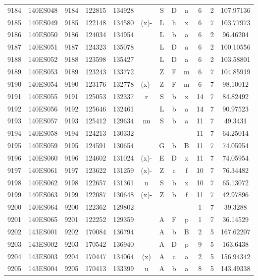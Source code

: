 \begin{tabular}{|*{12}{c|}}
9184 & 140ES048 & 9184 & 122815 & 134928 &  & S & D & a & 6 & 2 & 107.97136 \\ 
9185 & 140ES049 & 9185 & 122148 & 134580 & (x)- & L & h & x & 6 & 7 & 103.77973 \\ 
9186 & 140ES050 & 9186 & 124034 & 134954 &  & L & b & a & 6 & 2 & 96.46204 \\ 
9187 & 140ES051 & 9187 & 124323 & 135078 &  & L & D & a & 6 & 2 & 100.10556 \\ 
9188 & 140ES052 & 9188 & 123598 & 135427 &  & L & D & a & 6 & 2 & 103.58801 \\ 
9189 & 140ES053 & 9189 & 123243 & 133772 &  & Z & F & m & 6 & 7 & 104.85919 \\ 
9190 & 140ES054 & 9190 & 123176 & 132778 & (x)- & Z & F & m & 6 & 7 & 98.10012 \\ 
9191 & 140ES055 & 9191 & 125053 & 132337 & r & S & b & x & 14 & 7 & 84.82492 \\ 
9192 & 140ES056 & 9192 & 125646 & 132461 &  & L & b & a & 14 & 7 & 90.97523 \\ 
9193 & 140ES057 & 9193 & 125412 & 129634 & nu & S & b & a & 11 & 7 & 49.3431 \\ 
9194 & 140ES058 & 9194 & 124213 & 130332 &  &  &  &  & 11 & 7 & 64.25014 \\ 
9195 & 140ES059 & 9195 & 124591 & 130654 &  & G & b & B & 11 & 7 & 74.05954 \\ 
9196 & 140ES060 & 9196 & 124602 & 131024 & (x)- & E & D & x & 11 & 7 & 74.05954 \\ 
9197 & 140ES061 & 9197 & 123622 & 131259 & (x)- & Z & c & f & 10 & 7 & 76.34482 \\ 
9198 & 140ES062 & 9198 & 122657 & 131361 & n & S & b & x & 10 & 7 & 65.13072 \\ 
9199 & 140ES063 & 9199 & 122087 & 130648 & (x)- & Z & b & f & 11 & 7 & 42.97896 \\ 
9200 & 140ES064 & 9200 & 122362 & 129802 &  &  &  &  & 1 & 7 & 39.3288 \\ 
9201 & 140ES065 & 9201 & 122252 & 129359 &  & A & F & p & 1 & 7 & 36.14529 \\ 
9202 & 143ES001 & 9202 & 170084 & 136794 &  & A & b & B & 2 & 5 & 167.62207 \\ 
9203 & 143ES002 & 9203 & 170542 & 136940 &  & A & D & p & 9 & 5 & 163.6438 \\ 
9204 & 143ES003 & 9204 & 170447 & 134064 & (x) & A & c & a & 2 & 5 & 156.94342 \\ 
9205 & 143ES004 & 9205 & 170413 & 133399 & u & A & b & a & 8 & 5 & 143.49338 \\ 

\end{tabular}
